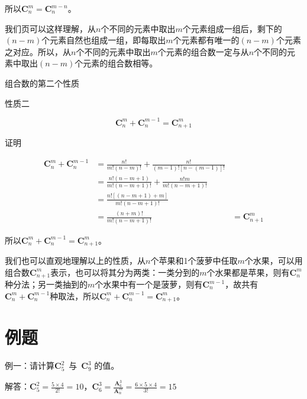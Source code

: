 所以$\textbf{C}_{n}^{m}=\textbf{C}_{n}^{m-n}$。

我们页可以这样理解，从$n$个不同的元素中取出$m$个元素组成一组后，剩下的$(n-m)$个元素自然也组成一组，即每取出$m$个元素都有唯一的$(n-m)$个元素之对应。所以，从$n$个不同的元素中取出$m$个元素的组合数一定与从$n$个不同的元素中取出$(n-m)$个元素的组合数相等。

组合数的第二个性质
\begin{flushleft}{\color{blue} 性质二}\end{flushleft}
\begin{equation}
    \textbf{C}_{n}^{m}+\textbf{C}_{n}^{m-1}=\textbf{C}_{n+1}^{m}
\end{equation}
\begin{flushleft}
	{\color{blue} 证明}
\end{flushleft}
\begin{equation*}
    \begin{aligned}
        \textbf{C}_{n}^{m}+\textbf{C}_{n}^{m-1} &= \frac{n!}{m!(n-m)!}+\frac{n!}{(m-1)![n-(m-1)]!} \\
        &= \frac{n!(n-m+1)}{m!(n-m+1)!}+\frac{n!m}{m!(n-m+1)!} \\
        &= \frac{n![(n-m+1)+m]}{m!(n-m+1)!} \\
        &= \frac{(n+m)!}{m!(n-m+1)!}
        &= \textbf{C}_{n+1}^{m}
    \end{aligned}
\end{equation*}

所以$\textbf{C}_{n}^{m}+\textbf{C}_{n}^{m-1}=\textbf{C}_{n+1}^{m}$。

我们也可以直观地理解以上的性质，从$n$个苹果和1个菠萝中任取$m$个水果，可以用组合数$\textbf{C}_{n+1}^{m}$表示，也可以将其分为两类：一类分到的$m$个水果都是苹果，则有$\textbf{C}_{n}^{m}$种分法；另一类抽到的$m$个水果中有一个是菠萝，则有$\textbf{C}_{n}^{m-1}$，故共有$\textbf{C}_{n}^{m}+\textbf{C}_{n}^{m-1}$种取法，所以$\textbf{C}_{n}^{m}+\textbf{C}_{n}^{m-1}=\textbf{C}_{n+1}^{m}$。

\section{例题}

{\color{blue} 例一：}{请计算$\textbf{C}_{5}^{2}$}~与~$\textbf{C}_{9}^{3}$ 的值。

{\color{blue} 解答：}$\textbf{C}_{5}^{2}=\frac{5\times{}4}{2!}=10$，$\textbf{C}_{6}^{3}=\frac{\textbf{A}_{6}^{3}}{\textbf{A}_{n}^{m}}=\frac{6\times{}5\times{}4}{3!} = 15$

